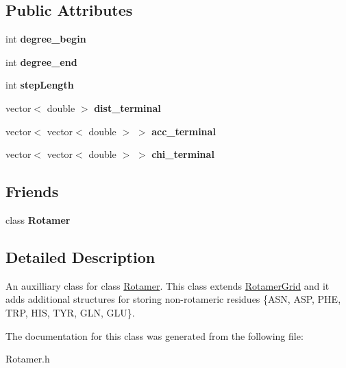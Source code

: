 \subsection*{Public Attributes}
\begin{DoxyCompactItemize}
\item 
\hypertarget{classRotamerGridSpecial_ac53c32c3b34fc7e3976582495e7dea0e}{int {\bfseries degree\-\_\-begin}}\label{classRotamerGridSpecial_ac53c32c3b34fc7e3976582495e7dea0e}

\item 
\hypertarget{classRotamerGridSpecial_aaf8c4aa2c1d5e45210a956cdbb65f089}{int {\bfseries degree\-\_\-end}}\label{classRotamerGridSpecial_aaf8c4aa2c1d5e45210a956cdbb65f089}

\item 
\hypertarget{classRotamerGridSpecial_a996558f134a1a036d40a7496f31b2617}{int {\bfseries step\-Length}}\label{classRotamerGridSpecial_a996558f134a1a036d40a7496f31b2617}

\item 
\hypertarget{classRotamerGridSpecial_aafe50c2b3a85df7bc1debc93d92c503a}{vector$<$ double $>$ {\bfseries dist\-\_\-terminal}}\label{classRotamerGridSpecial_aafe50c2b3a85df7bc1debc93d92c503a}

\item 
\hypertarget{classRotamerGridSpecial_a1898f65ca5d119c65da2a60a39d4fdbf}{vector$<$ vector$<$ double $>$ $>$ {\bfseries acc\-\_\-terminal}}\label{classRotamerGridSpecial_a1898f65ca5d119c65da2a60a39d4fdbf}

\item 
\hypertarget{classRotamerGridSpecial_ab833292e5da159102caef3cbc29aedd2}{vector$<$ vector$<$ double $>$ $>$ {\bfseries chi\-\_\-terminal}}\label{classRotamerGridSpecial_ab833292e5da159102caef3cbc29aedd2}

\end{DoxyCompactItemize}
\subsection*{Friends}
\begin{DoxyCompactItemize}
\item 
\hypertarget{classRotamerGridSpecial_abbb5e1f6ca569c67c8a354f8698eb62e}{class {\bfseries Rotamer}}\label{classRotamerGridSpecial_abbb5e1f6ca569c67c8a354f8698eb62e}

\end{DoxyCompactItemize}


\subsection{Detailed Description}
An auxilliary class for class \hyperlink{classRotamer}{Rotamer}. This class extends \hyperlink{classRotamerGrid}{Rotamer\-Grid} and it adds additional structures for storing non-\/rotameric residues \{A\-S\-N, A\-S\-P, P\-H\-E, T\-R\-P, H\-I\-S, T\-Y\-R, G\-L\-N, G\-L\-U\}. 

The documentation for this class was generated from the following file\-:\begin{DoxyCompactItemize}
\item 
Rotamer.\-h\end{DoxyCompactItemize}
